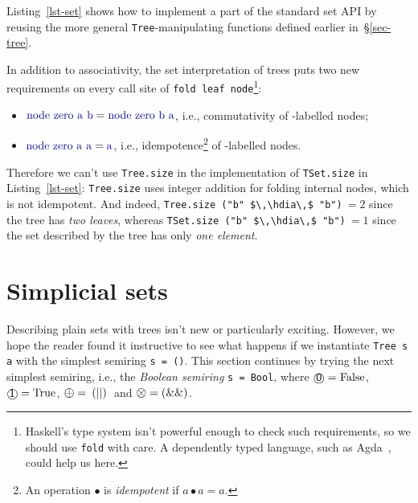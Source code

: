 \documentclass[english,submission]{programming}
\newcommand{\code}[1]{\lstinline[mathescape]|#1|}
\newcommand{\hcode}[1]{{\color{darkblue} \lstinline[keywordstyle={}]|#1|}} %
\newcommand{\hdia}{\,\text{\raisebox{-0.2mm}{\Large\color{darkblue} $\diamond$}}\,}
\newcommand{\add}{\text{\raisebox{-0.1mm}{\large $\oplus$}}}
\newcommand{\mul}{\text{\raisebox{-0.1mm}{\large $\otimes$}}}
\newcommand{\zero}{\raisebox{-0.2mm}{\textcircled{\textsf{0}}}\xspace}
\newcommand{\one}{\raisebox{-0.2mm}{\textcircled{\textsf{\hspace{-0.2mm}1}}}\xspace}
\begin{document}
\noindent
Listing~\ref{lst-set} shows how to implement a part of the standard set API by
reusing the more general \hcode{Tree}-manipulating functions defined earlier
in~\S\ref{sec-tree}.

In addition to associativity, the set interpretation of trees puts two new
requirements on every call site of \hcode{fold leaf node}\footnote{
    Haskell's type system isn't powerful enough to check such requirements, so
    we should use \hcode{fold} with care. A dependently typed language, such as
    Agda~\cite{2007_norell_agda}, could help us here.
}:

\begin{itemize}
    \item $\text{\hcode{node zero a b}} = \text{\hcode{node zero b a}}$, i.e.,
          commutativity of \zero-labelled nodes;
    \item $\text{\hcode{node zero a a}} = \text{\hcode{a}}$, i.e.,
    idempotence\footnote{
         An operation $\bullet$ is \emph{idempotent} if $a \bullet a = a$.
    } of \zero-labelled nodes.
\end{itemize}

\noindent
Therefore we can't use \hcode{Tree.}\code{size} in the implementation of
\hcode{TSet.}\code{size} in Listing~\ref{lst-set}: \hcode{Tree.}\code{size} uses
integer addition for folding internal nodes, which is not idempotent. And
indeed, \hcode{Tree.}\code{size ("b" $\,\hdia\,$ "b")}$\ =2$ since the tree has
\emph{two leaves}, whereas \hcode{TSet.}\code{size ("b" $\,\hdia\,$ "b")}$\ = 1$
since the set described by the tree has only \emph{one element}.

\section{Simplicial sets}\label{sec-simplicial-set}
\vspace{-1mm}

Describing plain sets with trees isn't new or particularly exciting. However, we
hope the reader found it instructive to see what happens if we instantiate
\hcode{Tree s a} with the simplest semiring \hcode{s = ()}. This section
continues by trying the next simplest semiring, i.e., the
\emph{Boolean semiring} \hcode{s = Bool}, where $\zero = \text{\code{False}}$,
$\one = \text{\code{True}}$, $\add = \text{\code{(\|\|)}}$ and
$\mul = \text{\code{(&&)}}$.
\end{document}
